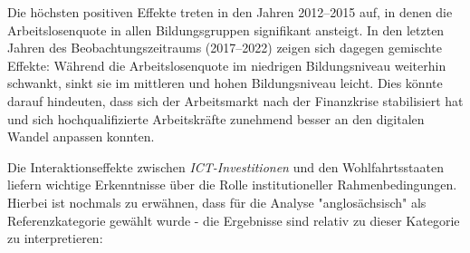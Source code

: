 Die höchsten positiven Effekte treten in den Jahren 2012–2015 auf, in denen die 
Arbeitslosenquote in allen Bildungsgruppen signifikant ansteigt. In den letzten Jahren des 
Beobachtungszeitraums (2017–2022) zeigen sich dagegen gemischte Effekte: Während die 
Arbeitslosenquote im niedrigen Bildungsniveau weiterhin schwankt, sinkt sie im mittleren 
und hohen Bildungsniveau leicht. Dies könnte darauf hindeuten, dass sich der Arbeitsmarkt 
nach der Finanzkrise stabilisiert hat und sich hochqualifizierte Arbeitskräfte zunehmend 
besser an den digitalen Wandel anpassen konnten.

Die Interaktionseffekte zwischen \textit{\ac{ICT}-Investitionen} und den 
Wohlfahrtsstaaten liefern wichtige Erkenntnisse über die Rolle institutioneller 
Rahmenbedingungen. Hierbei ist nochmals zu erwähnen, dass für die Analyse "anglosächsisch" 
als Referenzkategorie gewählt wurde - die Ergebnisse sind relativ zu dieser Kategorie zu 
interpretieren:

